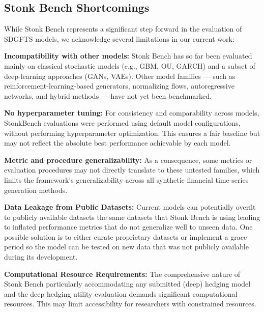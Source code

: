 \documentclass[sigconf]{acmart}
\begin{document}
  \subsection{Stonk Bench Shortcomings}\label{subsub:shortcomings}
      While Stonk Bench represents a significant step forward in the
      evaluation of SDGFTS models, we acknowledge several limitations
      in our current work:
    \begin{enumerate}[label=\textbf{[S\arabic*]}]
      \item \textbf{Incompatibility with other models:}
        Stonk Bench has so far been evaluated mainly on classical
        stochastic models (e.g., GBM, OU, GARCH) and a subset of
        deep-learning approaches (GANs, VAEs).
        Other model families — such as
        reinforcement-learning-based generators, normalizing flows,
        autoregressive networks, and hybrid methods — have not yet
        been benchmarked.
      \item \textbf{No hyperparameter tuning:} For consistency and
        comparability across models, StonkBench evaluations were
        performed using default model configurations, without
        performing hyperparameter optimization. This ensures a fair
        baseline but may not reflect the absolute best performance
        achievable by each model.
      \item \textbf{Metric and procedure generalizability:}
        As a consequence, some metrics or evaluation procedures may
        not directly translate to these untested families, which
        limits the framework's generalizability across all synthetic
        financial time-series generation methods.
      \item \textbf{Data Leakage from Public Datasets:} Current models
        can potentially overfit to publicly available datasets
        \textemdash the same datasets that Stonk Bench is using
        \textemdash leading to inflated performance metrics that do
        not generalize well to unseen data. One possible solution is
        to either curate proprietary datasets or implement a grace
        period so the model can be tested on new data that was not
        publicly available during its development.
      \item \textbf{Computational Resource Requirements:} The
        comprehensive nature of Stonk Bench \textemdash particularly
        accommodating any submitted (deep) hedging model and the deep
        hedging utility evaluation \textemdash demands significant
        computational resources. This may limit accessibility for
        researchers with constrained resources.
    \end{enumerate}
\end{document}
